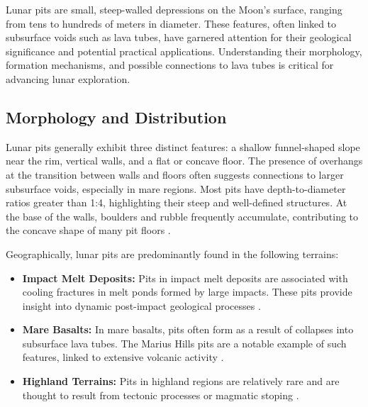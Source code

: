 \documentclass[12pt]{article}
\begin{document}
Lunar pits are small, steep-walled depressions on the Moon’s surface, ranging from tens to hundreds of meters in diameter. These features, often linked to subsurface voids such as lava tubes, have garnered attention for their geological significance and potential practical applications. Understanding their morphology, formation mechanisms, and possible connections to lava tubes is critical for advancing lunar exploration.

\subsection{Morphology and Distribution}
Lunar pits generally exhibit three distinct features: a shallow funnel-shaped slope near the rim, vertical walls, and a flat or concave floor. The presence of overhangs at the transition between walls and floors often suggests connections to larger subsurface voids, especially in mare regions. Most pits have depth-to-diameter ratios greater than 1:4, highlighting their steep and well-defined structures. At the base of the walls, boulders and rubble frequently accumulate, contributing to the concave shape of many pit floors \cite{lunar-pit-distribution, sublunear-lava}.

Geographically, lunar pits are predominantly found in the following terrains:
\begin{itemize}
    \item \textbf{Impact Melt Deposits:} Pits in impact melt deposits are associated with cooling fractures in melt ponds formed by large impacts. These pits provide insight into dynamic post-impact geological processes \cite{lunar-pit-distribution}.
    \item \textbf{Mare Basalts:} In mare basalts, pits often form as a result of collapses into subsurface lava tubes. The Marius Hills pits are a notable example of such features, linked to extensive volcanic activity \cite{lunar-pits-entrances-to-caves}.
    \item \textbf{Highland Terrains:} Pits in highland regions are relatively rare and are thought to result from tectonic processes or magmatic stoping \cite{lunar-pit-distribution}.
\end{itemize}
\end{document}
